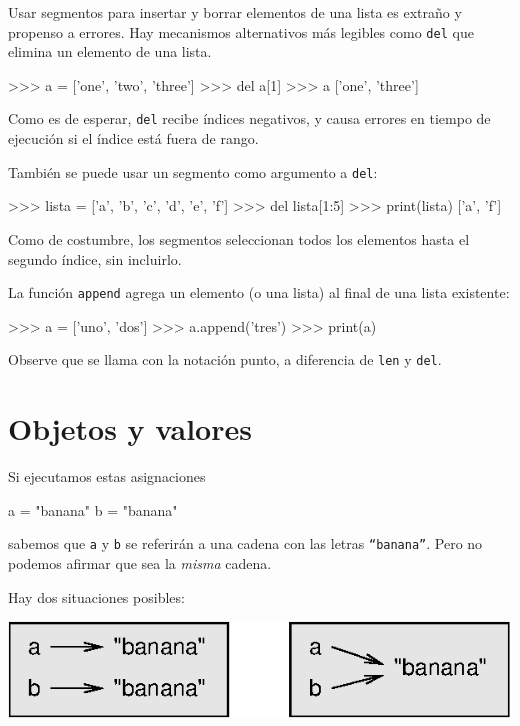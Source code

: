 
Usar segmentos para insertar y borrar elementos de una lista es extraño
y propenso a errores. Hay mecanismos alternativos más legibles como
\texttt{del} que elimina un elemento de una lista.

  
\begin{pyconcode}
>>> a = ['one', 'two', 'three']
>>> del a[1]
>>> a
['one', 'three']
\end{pyconcode}

Como es de esperar, \texttt{del} recibe índices negativos, y causa
errores en tiempo de ejecución si el índice está fuera de rango.

También se puede usar un segmento como argumento a \texttt{del}:
\begin{pyconcode}
>>> lista = ['a', 'b', 'c', 'd', 'e', 'f']
>>> del lista[1:5]
>>> print(lista)
['a', 'f']
\end{pyconcode}

Como de costumbre, los segmentos seleccionan todos los elementos hasta
el segundo índice, sin incluirlo.

La función \texttt{append} agrega un elemento (o una lista) al final
de una lista existente:
\begin{pyconcode}
>>> a = ['uno', 'dos']
>>> a.append('tres')
>>> print(a)
\end{pyconcode}

Observe que se llama con la notación punto, a diferencia de \texttt{len}
y \texttt{del}.

\section{Objetos y valores}

 

Si ejecutamos estas asignaciones
\begin{pythoncode}
a = "banana"
b = "banana"
\end{pythoncode}

sabemos que \texttt{a} y \texttt{b} se referirán a una cadena con
las letras \texttt{``banana''}. Pero no podemos afirmar que sea
la {\em misma} cadena.

Hay dos situaciones posibles:

\beforefig \centerline{\includegraphics{illustrations/list1}}
\afterfig

